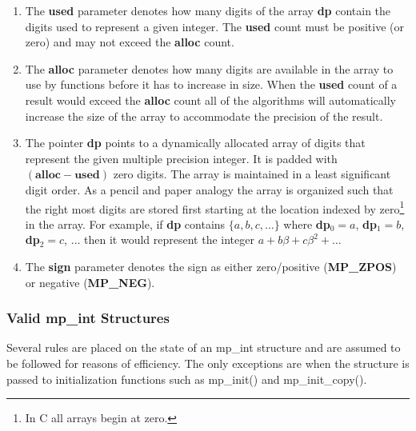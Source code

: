 \documentclass[b5paper]{book}
\begin{document}
\begin{enumerate}
\item The \textbf{used} parameter denotes how many digits of the array \textbf{dp} contain the digits used to represent
a given integer.  The \textbf{used} count must be positive (or zero) and may not exceed the \textbf{alloc} count.  

\item The \textbf{alloc} parameter denotes how 
many digits are available in the array to use by functions before it has to increase in size.  When the \textbf{used} count 
of a result would exceed the \textbf{alloc} count all of the algorithms will automatically increase the size of the 
array to accommodate the precision of the result.  

\item The pointer \textbf{dp} points to a dynamically allocated array of digits that represent the given multiple 
precision integer.  It is padded with $(\textbf{alloc} - \textbf{used})$ zero digits.  The array is maintained in a least 
significant digit order.  As a pencil and paper analogy the array is organized such that the right most digits are stored
first starting at the location indexed by zero\footnote{In C all arrays begin at zero.} in the array.  For example, 
if \textbf{dp} contains $\lbrace a, b, c, \ldots \rbrace$ where \textbf{dp}$_0 = a$, \textbf{dp}$_1 = b$, \textbf{dp}$_2 = c$, $\ldots$ then 
it would represent the integer $a + b\beta + c\beta^2 + \ldots$  

 
\item The \textbf{sign} parameter denotes the sign as either zero/positive (\textbf{MP\_ZPOS}) or negative (\textbf{MP\_NEG}).  
\end{enumerate}

\subsubsection{Valid mp\_int Structures}
Several rules are placed on the state of an mp\_int structure and are assumed to be followed for reasons of efficiency.  
The only exceptions are when the structure is passed to initialization functions such as mp\_init() and mp\_init\_copy().
\end{document}

